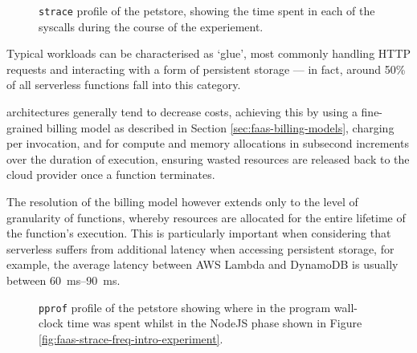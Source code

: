 \begin{figure}
    \begin{center}
        
    \end{center}
    \caption{\texttt{strace} profile of the \faas{} petstore, showing the time spent in each of the syscalls during the course of the experiement.}
    \label{fig:faas-strace-time-intro-experiment}
\end{figure}

Typical \faas{} workloads can be characterised as `glue', most commonly handling HTTP requests and interacting with a form of persistent storage --- in fact, around 50\% of all serverless functions fall into this category\cite{eismannReviewServerlessUse2020}.

\faas{} architectures generally tend to decrease costs, achieving this by using a fine-grained billing model as described in Section \ref{sec:faas-billing-models}, charging per invocation, and for compute and memory allocations in subsecond increments over the duration of execution, ensuring wasted resources are released back to the cloud provider once a function terminates.

The resolution of the billing model however extends only to the level of granularity of functions, whereby resources are allocated for the entire lifetime of the function's execution. This is particularly important when considering that serverless suffers from additional latency when accessing persistent storage, for example, the average latency between AWS Lambda and DynamoDB is usually between \qtyrange{60}{90}{\ms}\cite{ghoshCachingTechniquesImprove2020}.

\begin{figure*}
    \begin{center}
        \begin{tikzpicture}[scale = 0.75, every node/.style={scale=0.75}]
            
        \end{tikzpicture}
    \end{center}
    \caption{\texttt{pprof} profile of the \faas{} petstore showing where in the program wall-clock time was spent whilst in the NodeJS phase shown in Figure \ref{fig:faas-strace-freq-intro-experiment}.}
    \label{fig:faas-pprof-intro-experiment}
\end{figure*}

